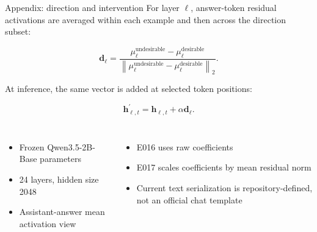 \documentclass[aspectratio=169,10pt]{beamer}
\newenvironment{tightitemize}{%
  \begin{itemize}\setlength\itemsep{0.38em}\setlength\parskip{0pt}%
}{\end{itemize}}
\begin{document}
\begin{frame}{Appendix: direction and intervention}
\small
For layer $\ell$, answer-token residual activations are averaged within each
example and then across the direction subset:

\[
\mathbf{d}_{\ell}=
\frac{\mu^{\text{undesirable}}_{\ell}-
\mu^{\text{desirable}}_{\ell}}
{\left\|\mu^{\text{undesirable}}_{\ell}-
\mu^{\text{desirable}}_{\ell}\right\|_2}.
\]

At inference, the same vector is added at selected token positions:

\[
\mathbf{h}^{\prime}_{\ell,t}=\mathbf{h}_{\ell,t}+\alpha\mathbf{d}_{\ell}.
\]

\begin{columns}[T,onlytextwidth]
\begin{tightitemize}
  \item Frozen Qwen3.5-2B-Base parameters
  \item 24 layers, hidden size 2048
  \item Assistant-answer mean activation view
\end{tightitemize}
\begin{tightitemize}
  \item E016 uses raw coefficients
  \item E017 scales coefficients by mean residual norm
  \item Current text serialization is repository-defined, not an official chat template
\end{tightitemize}
\end{columns}
\end{frame}
\end{document}
